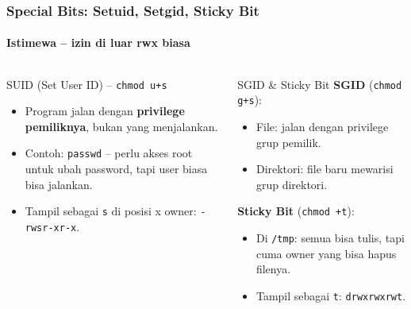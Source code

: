 \documentclass[t,aspectratio=169,xcolor=dvipsnames]{beamer}
\begin{document}
\begin{frame}
    \frametitle{Special Bits: Setuid, Setgid, Sticky Bit}
    \framesubtitle{Istimewa -- izin di luar rwx biasa}

    \begin{columns}[T]
        \begin{block}{SUID (Set User ID) -- \texttt{chmod u+s}}
            \small
            \begin{itemize}
                \item Program jalan dengan \textbf{privilege pemiliknya}, bukan yang menjalankan.
                \item Contoh: \texttt{passwd} -- perlu akses root untuk ubah password, tapi user biasa bisa jalankan.
                \item Tampil sebagai \texttt{s} di posisi x owner: \texttt{-rwsr-xr-x}.
            \end{itemize}
        \end{block}

        \begin{block}{SGID \& Sticky Bit}
            \small
            \textbf{SGID} (\texttt{chmod g+s}):
            \begin{itemize}
                \item File: jalan dengan privilege grup pemilik.
                \item Direktori: file baru mewarisi grup direktori.
            \end{itemize}
            \vspace{0.1cm}
            \textbf{Sticky Bit} (\texttt{chmod +t}):
            \begin{itemize}
                \item Di \texttt{/tmp}: semua bisa tulis, tapi cuma owner yang bisa hapus filenya.
                \item Tampil sebagai \texttt{t}: \texttt{drwxrwxrwt}.
            \end{itemize}
        \end{block}
    \end{columns}
\end{frame}
\end{document}

